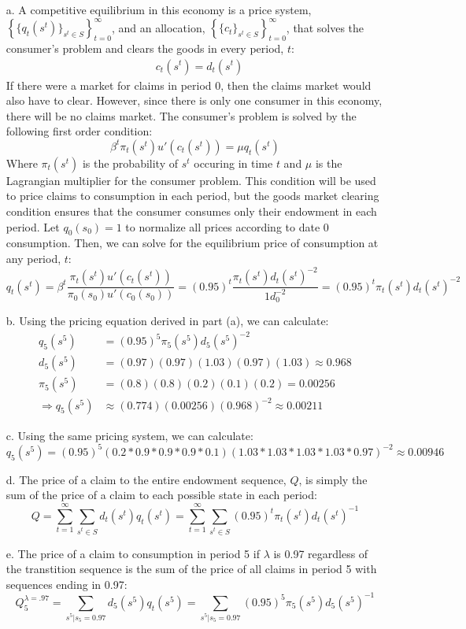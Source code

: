 \documentclass{article}
\begin{document}
\begin{itemize}
	\item[a.] A competitive equilibrium in this economy is a price system, ${\left\{\{q_t(s^t)\}_{s^t\in S}\right\}_{t=0}^\infty}$, and an allocation, ${\left\{\{c_t\}_{s^t\in S}\right\}_{t=0}^\infty}$, that solves the consumer's problem and clears the goods in every period, $t$:
		\begin{align*} &c_t(s^t) = d_t(s^t)  \end{align*}
		If there were a market for claims in period 0, then the claims market would also have to clear. However, since there is only one consumer in this economy, there will be no claims market. The consumer's problem is solved by the following first order condition:
		\[
			\beta^t\pi_t(s^t)u'(c_t(s^t)) = \mu q_t(s^t)
		\]
		Where $\pi_t(s^t)$ is the probability of $s^t$ occuring in time $t$ and $\mu$ is the Lagrangian multiplier for the consumer problem. This condition will be used to price claims to consumption in each period, but the goods market clearing condition ensures that the consumer consumes only their endowment in each period. Let ${q_0(s_0)=1}$ to normalize all prices according to date 0 consumption. Then, we can solve for the equilibrium price of consumption at any period, $t$:
		\[
			q_t(s^t) = \beta^t\frac{\pi_t(s^t)u'(c_t(s^t))}{\pi_0(s_0)u'(c_0(s_0))} = (0.95)^t\frac{\pi_t(s^t)d_t(s^t)^{-2}}{1d_0^{-2}} = (0.95)^t\pi_t(s^t)d_t(s^t)^{-2}
		\]
	
	\item[b.] Using the pricing equation derived in part (a), we can calculate:
		\begin{align*}
						q_5(s^5)	&= (0.95)^5\pi_5(s^5)d_5(s^5)^{-2}						\\
						d_5(s^5)	&= (0.97)(0.97)(1.03)(0.97)(1.03) \approx 0.968			\\
						\pi_5(s^5)	&= (0.8)(0.8)(0.2)(0.1)(0.2) = 0.00256					\\
			\Rightarrow q_5(s^5)	&\approx (0.774)(0.00256)(0.968)^{-2} \approx 0.00211
		\end{align*}
	
	\item[c.] Using the same pricing system, we can calculate:
		\[
			q_5(s^5) = (0.95)^5\left(0.2*0.9*0.9*0.9*0.1\right)\left(1.03*1.03*1.03*1.03*0.97\right)^{-2} \approx 0.00946
		\]
	
	\item[d.] The price of a claim to the entire endowment sequence, $Q$, is simply the sum of the price of a claim to each possible state in each period:
		\[
			Q = \sum_{t=1}^\infty \sum_{s^t\in S} d_t(s^t)q_t(s^t) = \sum_{t=1}^\infty \sum_{s^t\in S} (0.95)^t\pi_t(s^t)d_t(s^t)^{-1}
		\]
	
	\item[e.] The price of a claim to consumption in period 5 if $\lambda$ is 0.97 regardless of the transtition sequence is the sum of the price of all claims in period 5 with sequences ending in 0.97:
		\[
			Q_5^{\lambda = .97} = \sum_{s^5|s_5=0.97} d_5(s^5)q_t(s^5) = \sum_{s^5|s_5=0.97}(0.95)^5\pi_5(s^5)d_5(s^5)^{-1}
		\]
	
\end{itemize}
\end{document}
